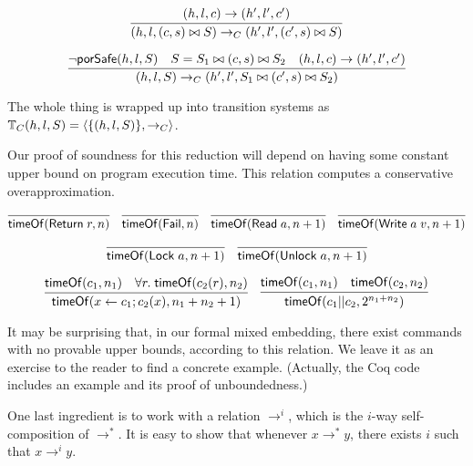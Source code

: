 \documentclass{amsbook}
\theoremstyle{definition}
\theoremstyle{remark}
\numberwithin{section}{chapter}
\numberwithin{equation}{chapter}
\begin{document}
$$\infer{\smallstepC{(h, l, \concat{(c, s)}{S})}{(h', l', \concat{(c', s)}{S})}}{
  \smallstep{(h, l, c)}{(h', l', c')}
}$$

$$\infer{\smallstepC{(h, l, S)}{(h', l', \concat{S_1}{\concat{(c', s)}{S_2}})}}{
  \neg \pors{h, l, S}
  & S = \concat{S_1}{\concat{(c, s)}{S_2}}
  & \smallstep{(h, l, c)}{(h', l', c')}
}$$

The whole thing is wrapped up into transition systems as $\mathbb T_C(h, l, S) = {\left \langle \{(h, l, S)\}, \to_C \right \rangle}$.

\newcommand{\tof}[2]{\mt{timeOf}(#1, #2)}

Our proof of soundness for this reduction will depend on having some constant upper bound on program execution time.
This relation computes a conservative overapproximation.

$$\infer{\tof{\mt{Return} \; r}{n}}{}
\quad \infer{\tof{\mt{Fail}}{n}}{}
\quad \infer{\tof{\mt{Read} \; a}{n+1}}{}
\quad \infer{\tof{\mt{Write} \; a \; v}{n+1}}{}$$

$$\infer{\tof{\mt{Lock} \; a}{n+1}}{}
\quad \infer{\tof{\mt{Unlock} \; a}{n+1}}{}$$

$$\infer{\tof{x \leftarrow c_1; c_2(x)}{n_1 + n_2 + 1}}{
  \tof{c_1}{n_1}
  & \forall r. \; \tof{c_2(r)}{n_2}
}
\quad \infer{\tof{c_1 || c_2}{2^{n_1 + n_2}}}{
  \tof{c_1}{n_1}
  & \tof{c_2}{n_2}
}$$

It may be surprising that, in our formal mixed embedding, there exist commands with no provable upper bounds, according to this relation.
We leave it as an exercise to the reader to find a concrete example.
(Actually, the Coq code includes an example and its proof of unboundedness.)

One last ingredient is to work with a relation $\to^i$, which is the $i$-way self-composition of $\to^*$.
It is easy to show that whenever $x \to^* y$, there exists $i$ such that $x \to^i y$.

\newcommand{\smallstepsC}[2]{#1 \to_C^* #2}
\end{document}
